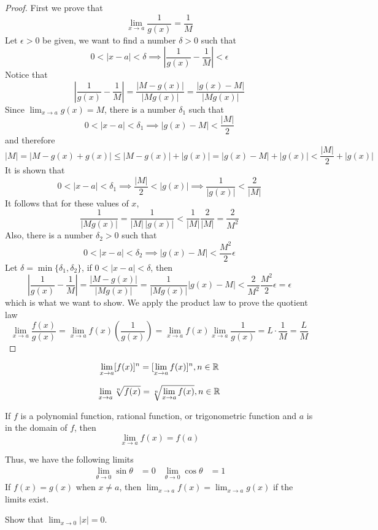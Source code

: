 \begin{proof}
    First we prove that \[\lim_{x\to a}\frac{1}{g(x)}=\frac{1}{M}\]
    Let \(\epsilon>0\) be given,
    we want to find a number \(\delta>0\) such that
    \[0<|x-a|<\delta\implies\left|\frac{1}{g(x)}-\frac{1}{M}\right|<\epsilon\]
    Notice that \[\left|\frac{1}{g(x)}-\frac{1}{M}\right|
    =\frac{|M-g(x)|}{|Mg(x)|}=\frac{|g(x)-M|}{|Mg(x)|}\]
    Since \(\lim_{x\to a}g(x)=M\), there is a number \(\delta_1\) such that
    \[0<|x-a|<\delta_1\implies|g(x)-M|<\frac{|M|}{2}\] and therefore
    \[|M|=|M-g(x)+g(x)|\leq|M-g(x)|+|g(x)|=|g(x)-M|+|g(x)|
    <\frac{|M|}{2}+|g(x)|\]
    It is shown that
    \[0<|x-a|<\delta_1\implies\frac{|M|}{2}<|g(x)|\implies\frac{1}{|g(x)|}
    <\frac{2}{|M|}\]
    It follows that for these values of \(x\),
    \[\frac{1}{|Mg(x)|}=\frac{1}{|M|\,|g(x)|}<\frac{1}{|M|}\frac{2}{|M|}
    =\frac{2}{M^2}\]
    Also, there is a number \(\delta_2>0\) such that
    \[0<|x-a|<\delta_2\implies|g(x)-M|<\frac{M^2}{2}\epsilon\]
    Let \(\delta=\min\{\delta_1,\delta_2\}\), if \(0<|x-a|<\delta\), then
    \[\left|\frac{1}{g(x)}-\frac{1}{M}\right|=\frac{|M-g(x)|}{|Mg(x)|}
    =\frac{1}{|Mg(x)|}|g(x)-M|<\frac{2}{M^2}\frac{M^2}{2}\epsilon=\epsilon\]
    which is what we want to show.
    We apply the product law to prove the quotient law
    \[\lim_{x\to a}\frac{f(x)}{g(x)}
    =\lim_{x\to a}f(x)\left(\frac{1}{g(x)}\right)
    =\lim_{x\to a}f(x)\lim_{x\to a}\frac{1}{g(x)}=L\cdot\frac{1}{M}
    =\frac{L}{M}\]
\end{proof}
\begin{theorem}
    \[\lim_{x\to a}[f(x)]^n=[\lim_{x\to a}f(x)]^n,n\in\mathbb{R}\]
\end{theorem}
\begin{theorem}
    \[\lim_{x\to a}\sqrt[n]{f(x)}=\sqrt[n]{\lim_{x\to a}f(x)},n\in\mathbb{R}\]
\end{theorem}
\begin{theorem}
    If \(f\) is a polynomial function, rational function, or trigonometric
    function and \(a\) is in the domain of \(f\), then
    \[\lim_{x\to a}f(x)=f(a)\]
\end{theorem}
Thus, we have the following limits
\begin{align*}
    \lim_{\theta\to 0}\sin\theta &= 0 & \lim_{\theta\to 0}\cos\theta &= 1
\end{align*}
If \(f(x)=g(x)\) when \(x\neq a\),
then \(\lim_{x\to a}f(x)=\lim_{x\to a}g(x)\) if the limits exist.
\begin{problem}
    Show that \(\lim_{x\to 0}|x|=0\).
\end{problem}

